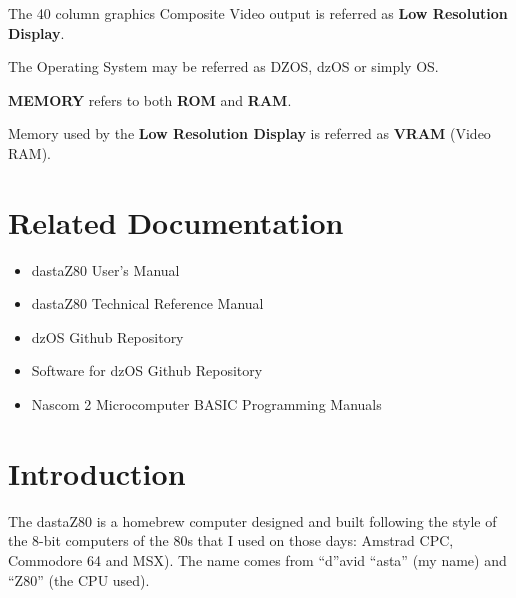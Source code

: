 \documentclass[a4paper,11pt]{article}
\begin{document}
    The 40 column graphics Composite Video output is referred as \textbf{Low
    Resolution Display}.
    
    The Operating System may be referred as DZOS, dzOS or simply OS.

    \textbf{MEMORY} refers to both \textbf{ROM} and \textbf{RAM}.

    Memory used by the \textbf{Low Resolution Display} is referred as
    \textbf{VRAM} (Video RAM).

    \pagebreak
    \section*{Related Documentation}
    \begin{itemize}
        \item dastaZ80 User's Manual\cite{dastaz80userman}
        \item dastaZ80 Technical Reference Manual\cite{dastaz80techman}
        \item dzOS Github Repository\cite{dastaZ80github}
        \item Software for dzOS Github Repository\cite{dastaZ80githubsoft}
        \item Nascom 2 Microcomputer BASIC Programming Manuals\cite{nascombasic}
    \end{itemize}

    \pagebreak
    \tableofcontents

    \pagebreak
    \pagestyle{fancy}
    \fancyhf{}
    \fancyfoot[R]{\thepage}
    \setcounter{page}{1}
    \section{Introduction}
    The dastaZ80 is a homebrew computer designed and built following the style
    of the 8-bit computers of the 80s that I used on those days: Amstrad CPC,
    Commodore 64 and MSX). The name comes from “d”avid “asta” (my name) and 
    “Z80” (the CPU used).
\end{document}
